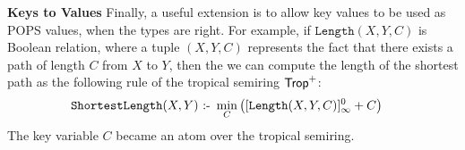 

{\bf Keys to Values} Finally, a useful extension is to allow key
values to be used as POPS values, when the types are right.  For
example, if $\texttt{Length}(X,Y,C)$ is Boolean relation, where a
tuple $(X,Y,C)$ represents the fact that there exists a path of length
$C$ from $X$ to $Y$, then the we can compute the length of the
shortest path as the following rule of the tropical semiring
$\text{\sf Trop}^+$:
%
  \begin{align*}
    \texttt{ShortestLength}(X,Y) &\text{ :- } \min_C \left([\texttt{Length}(X,Y,C)]_\infty^0 + C\right)
  \end{align*}
%
  The key variable $C$ became an atom over the tropical semiring.

